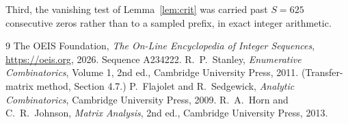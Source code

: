 \documentclass[11pt,a4paper]{article}
\theoremstyle{plain}
\theoremstyle{definition}
\begin{document}
Third, the vanishing test of Lemma~\ref{lem:crit} was carried past $S=625$ consecutive
zeros rather than to a sampled prefix, in exact integer arithmetic.

\begin{thebibliography}{9}
 The OEIS Foundation, \emph{The On-Line Encyclopedia of Integer
Sequences}, \url{https://oeis.org}, 2026. Sequence A234222.
 R.~P.~Stanley, \emph{Enumerative Combinatorics}, Volume 1, 2nd ed.,
Cambridge University Press, 2011. (Transfer-matrix method, Section 4.7.)
 P.~Flajolet and R.~Sedgewick, \emph{Analytic Combinatorics}, Cambridge
University Press, 2009.
 R.~A.~Horn and C.~R.~Johnson, \emph{Matrix Analysis}, 2nd ed., Cambridge
University Press, 2013.
\end{thebibliography}
\end{document}
